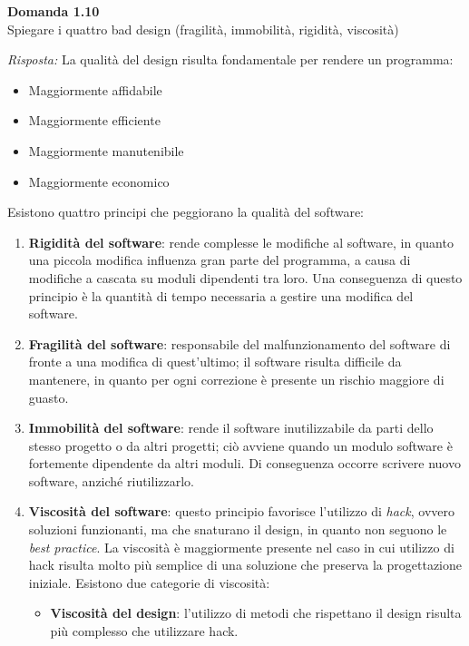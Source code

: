 \documentclass{article}
\newenvironment{problem}[2][Domanda]
    { \begin{mdframed}[backgroundcolor=gray!20] \textbf{#1 #2} \\}
    {  \end{mdframed}}
\newenvironment{solution}
    {\textit{Risposta:}}
    {}
\begin{document}
\begin{problem}{1.10}
Spiegare i quattro bad design (fragilità, immobilità, rigidità, viscosità)
\end{problem}
\begin{solution}
La qualità del design risulta fondamentale per rendere un programma:
\begin{itemize}
	\item Maggiormente affidabile
	\item Maggiormente efficiente
	\item Maggiormente manutenibile
	\item Maggiormente economico
\end{itemize}
Esistono quattro principi che peggiorano la qualità del software:
\begin{enumerate}
	\item \textbf{Rigidità del software}: rende complesse le modifiche al software, in quanto una piccola modifica influenza gran parte del programma, a causa di modifiche a cascata su moduli dipendenti tra loro.
	\newline Una conseguenza di questo principio è la quantità di tempo necessaria a gestire una modifica del software.
	\item \textbf{Fragilità del software}: responsabile del malfunzionamento del software di fronte a una modifica di quest'ultimo; il software risulta difficile da mantenere, in quanto per ogni correzione è presente un rischio maggiore di guasto.
	\item \textbf{Immobilità del software}: rende il software inutilizzabile da parti dello stesso progetto o da altri progetti; ciò avviene quando un modulo software è fortemente dipendente da altri moduli.
	\newline Di conseguenza occorre scrivere nuovo software, anziché riutilizzarlo.
	\item \textbf{Viscosità del software}: questo principio favorisce l'utilizzo di \textit{hack}, ovvero soluzioni funzionanti, ma che snaturano il design, in quanto non seguono le \textit{best practice}.
	\newline
	La viscosità è maggiormente presente nel caso in cui utilizzo di hack risulta molto più semplice di una soluzione che preserva la progettazione iniziale.
	\newline
	Esistono due categorie di viscosità:
	\begin{itemize}
		\item \textbf{Viscosità del design}: l'utilizzo di metodi che rispettano il design risulta più complesso che utilizzare hack.

\end{itemize}
\end{enumerate}
\end{solution}
\end{document}

